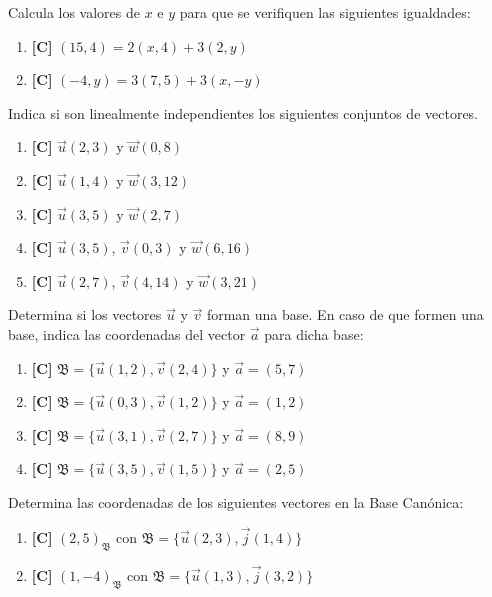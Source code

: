 \Exercicio Calcula los valores de $x$ e $y$ para que se verifiquen las siguientes igualdades:

\begin{enumerate}[topsep=0pt]
	\item \textbf{[C]} $ (15, 4) = 2(x, 4) + 3(2, y) $
	\item \textbf{[C]} $ (-4, y) = 3(7, 5) + 3(x, -y) $
\end{enumerate}


\Exercicio Indica si son linealmente independientes los siguientes conjuntos de vectores.

\begin{enumerate}[topsep=0pt]
	\item \textbf{[C]} $\vec{u}(2,3)$ y $\vec{w}(0,8)$
	\item \textbf{[C]} $\vec{u}(1,4)$ y $\vec{w}(3, 12)$
	\item \textbf{[C]} $\vec{u}(3,5)$ y $\vec{w}(2,7)$
	\item \textbf{[C]} $\vec{u}(3,5)$, $\vec{v}(0,3)$ y $\vec{w}(6,16)$
	\item \textbf{[C]} $\vec{u}(2,7)$, $\vec{v}(4,14)$ y $\vec{w}(3,21)$
\end{enumerate}


\Exercicio Determina si los vectores $\vec{u}$ y $\vec{v}$ forman una base. En caso de que formen una base, indica las coordenadas del vector $\vec{a}$ para dicha base:

\begin{enumerate}[topsep=0pt]
	\item \textbf{[C]} $\mathfrak{B} = \{\vec{u}(1,2), \vec{v}(2,4)\}$ y $\vec{a} = (5,7)$
	\item \textbf{[C]} $\mathfrak{B} = \{\vec{u}(0,3), \vec{v}(1,2)\}$ y $\vec{a} = (1,2)$
	\item \textbf{[C]} $\mathfrak{B} = \{\vec{u}(3,1), \vec{v}(2,7)\}$ y $\vec{a} = (8,9)$
	\item \textbf{[C]} $\mathfrak{B} = \{\vec{u}(3,5), \vec{v}(1,5)\}$ y $\vec{a} = (2,5)$
\end{enumerate}


\Exercicio Determina las coordenadas de los siguientes vectores en la Base Canónica:

\begin{enumerate}[topsep=0pt]
	\item \textbf{[C]} $ (2,5)_\mathfrak{\mathfrak{B}} $ con $\mathfrak{B} = \{\vec{u}(2,3), \vec{j}(1,4) \} $
	\item \textbf{[C]} $ (1,-4)_\mathfrak{B} $ con $\mathfrak{B} = \{\vec{u}(1,3), \vec{j}(3,2) \} $
\end{enumerate}


